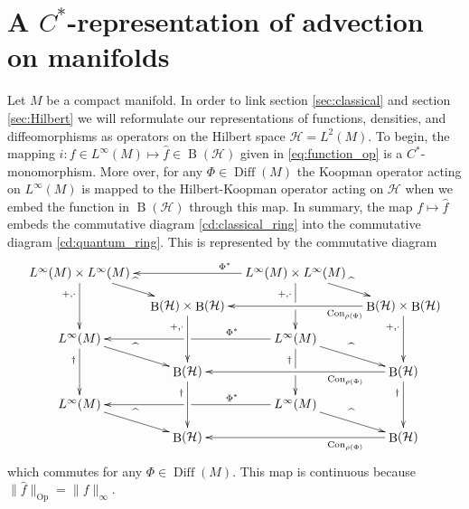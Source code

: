 \documentclass[12pt]{amsart}
\renewcommand{\H}{\ensuremath{\mathcal{H}}}
\DeclareMathOperator{\Diff}{Diff}
\DeclareMathOperator{\B}{B}
\DeclareMathOperator{\Op}{Op}
\DeclareMathOperator{\Con}{Con}
\begin{document}
\section{A $C^*$-representation of advection on manifolds}
\label{sec:embedding}
Let $M$ be a compact manifold.
In order to link section \ref{sec:classical} and section \ref{sec:Hilbert}
we will reformulate our representations of functions, densities, and diffeomorphisms as operators on the Hilbert space $\H = L^2(M)$.
To begin, the mapping $i: f \in L^\infty(M) \mapsto \hat{f} \in \B(\H)$ given in \eqref{eq:function_op} is a $C^*$-monomorphism.
More over, for any $\Phi \in \Diff(M)$ the Koopman operator acting on $L^\infty(M)$ is mapped to the Hilbert-Koopman operator acting on $\H$ when we embed the function in $\B( \H )$ through this map.
In summary, the map $f \mapsto \hat{f}$ embeds the commutative diagram \eqref{cd:classical_ring} into the commutative diagram \eqref{cd:quantum_ring}.
This is represented by the commutative diagram
\begin{align*}
	\xymatrix@=1em{
		L^\infty(M) \times L^\infty(M) \ar[dr]^{\widehat{\phantom{c}}} \ar[dd]_<(0.2){+,\cdot} & & \ar[ll]_<(0.1){ \Phi^*} L^\infty(M) \times L^\infty(M) \ar[dr]^{\widehat{\phantom{c}} } \ar[dd]_<(0.2){+,\cdot}|!{[dr];[dl]}\hole \\
		& \B( \H ) \times \B(\H) \ar[dd]_<(0.2){+,\cdot} & & \ar[ll]^<(0.1){\Con_{\rho(\Phi)}} \B(\H) \times \B(\H) \ar[dd]_<(0.2){+,\cdot} \\
		L^\infty(M) \ar[dr]^{\widehat{\phantom{c}}} \ar[dd]_<(0.2){\dagger} & & \ar[ll]_<(0.2){\Phi^*}|!{[ul];[dl]}\hole L^\infty(M) \ar[dr]^{\widehat{\phantom{c}}} \ar[dd]_<(0.2){\dagger}|!{[dr];[dl]}\hole \\
		& \B(\H) \ar[dd]_<(0.2){\dagger} & & \ar[ll]^<(0.2){\Con_{\rho(\Phi)}} \B(\H) \ar[dd]_<(0.2){\dagger} \\
		L^\infty(M) \ar[dr]^{\widehat{\phantom{c}}} & & \ar[ll]_<(0.2){\Phi^*}|!{[ul];[dl]}\hole L^\infty(M) \ar[dr]^{\widehat{\phantom{c}}} \\
		& \B(\H) & & \ar[ll]^<(0.2){\Con_{\rho(\Phi)}} \B(\H)
	}
\end{align*}
which commutes for any $\Phi \in \Diff(M)$.
This map is continuous because $\| \hat{f} \|_{\Op} = \| f \|_{\infty}$.
\end{document}
